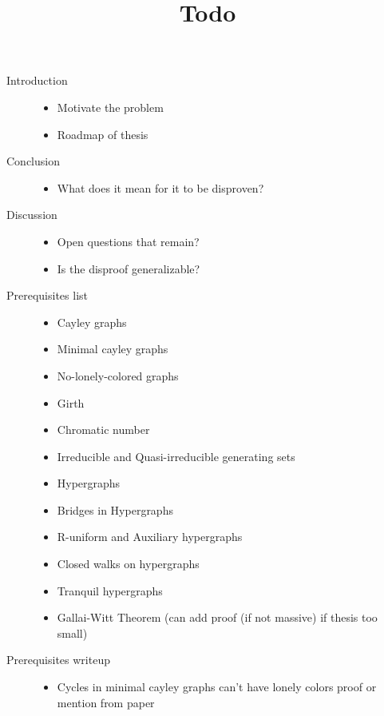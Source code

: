 \documentclass[a4paper,10pt]{article}
\title{Todo}
\begin{document}
\maketitle

\begin{description}
    \item[Introduction]
    \begin{itemize}
        \item Motivate the problem
        \item Roadmap of thesis
    \end{itemize}
    \item[Conclusion]
    \begin{itemize}
        \item What does it mean for it to be disproven?
    \end{itemize}
    \item[Discussion]
    \begin{itemize}
        \item Open questions that remain?
        \item Is the disproof generalizable?
    \end{itemize}
    \item[Prerequisites list] 
    \begin{itemize}
        \item Cayley graphs
        \item Minimal cayley graphs
        \item No-lonely-colored graphs
        \item Girth
        \item Chromatic number
        \item Irreducible and Quasi-irreducible generating sets
        \item Hypergraphs
        \item Bridges in Hypergraphs
        \item R-uniform and Auxiliary hypergraphs
        \item Closed walks on hypergraphs
        \item Tranquil hypergraphs
        \item Gallai-Witt Theorem (can add proof (if not massive) if thesis too small)
    \end{itemize}
    \item[Prerequisites writeup] 
    \begin{itemize}
        \item Cycles in minimal cayley graphs can't have lonely colors proof or mention from paper

\end{itemize}
\end{description}
\end{document}
